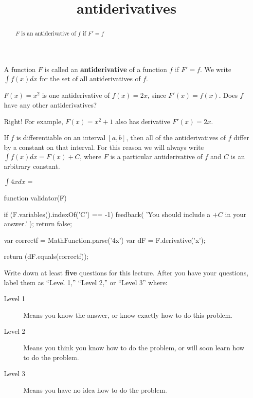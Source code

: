 \documentclass{ximera}
\title{antiderivatives}
\begin{document}
\begin{abstract}
  $F$ is an antiderivative of $f$ if $F'=f$
\end{abstract}

\maketitle

\begin{definition}
	A function $F$ is called an \textbf{antiderivative} of a function $f$ if $F' = f$.  We write $\int f(x) dx$ for the set of all antiderivatives of $f$.
\end{definition}

\begin{question}
	$F(x) = x^2$ is one antiderivative of $f(x) = 2x$, since $F'(x) = f(x)$.  Does $f$ have any other antiderivatives?
\begin{solution}
	 \begin{multipleChoice}
    	\end{multipleChoice}  
  \end{solution}
  
  Right!  For example, $F(x) = x^2+1$ also has derivative $F'(x) = 2x$.
\end{question}

\begin{theorem}
	If $f$ is differentiable on an interval $[a,b]$, then all of the antiderivatives of $f$ differ by a constant on that interval.  For this reason we will always write $\int f(x) dx  = F(x)+C$, where $F$ is a particular antiderivative of $f$ and $C$ is an arbitrary constant.
\end{theorem}

\begin{question}
 	$\int 4x dx = $ 
	\begin{expression-answer}
 function validator(F) {
   if (F.variables().indexOf('C') == -1) {
     feedback( 'You should include a $+C$ in your answer.' );
     return false;
   }
   
   var correctf = MathFunction.parse('4x')
   var dF = F.derivative('x');
   
   return (dF.equals(correctf));
 }
\end{expression-answer}	
	
\end{question}

\begin{question}
Write down at least \textbf{five} questions for this lecture. After
you have your questions, label them as ``Level 1,'' ``Level 2,'' or ``Level 3'' where:
\begin{description}
\item[Level 1] Means you know the answer, or know exactly how to do this problem.
\item[Level 2] Means you think you know how to do the problem, or will soon learn how to do the problem.
\item[Level 3] Means you have no idea how to do the problem. 
\end{description}
\begin{freeResponse}
\end{freeResponse}
\end{question}
\end{document}
